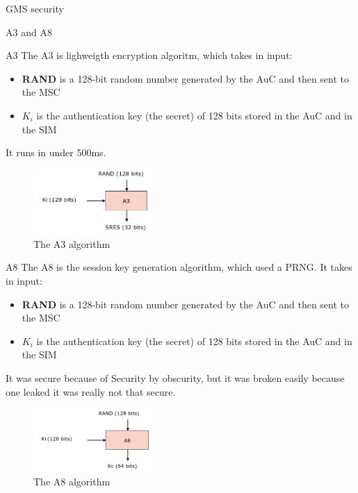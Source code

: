 \begin{section}{GMS security}
   \begin{subsection}{A3 and A8}
     \begin{subsubsection}{A3}
       The A3 is lighweigth encryption algoritm, which takes in input:
       \begin{itemize}
         \item \textbf{RAND} is a 128-bit random number generated by the AuC and then sent to the MSC
         \item \textbf{$K_i$} is the authentication key (the secret) of 128 bits stored in the AuC and
           in the SIM
       \end{itemize}
       It runs in under 500ms.
       \begin{figure}[h]
         \centering
         \includegraphics[width=0.4\textwidth]{img/wireless/a3.png}
         \caption{The A3 algorithm}
       \end{figure}
     \end{subsubsection}
     \begin{subsubsection}{A8}
       The A8 is the session key generation algorithm, which used a PRNG. It takes in input:
       \begin{itemize}
         \item \textbf{RAND} is a 128-bit random number generated by the AuC and then sent to the MSC
         \item \textbf{$K_i$} is the authentication key (the secret) of 128 bits stored in the AuC and
           in the SIM
       \end{itemize}
       It was secure because of Security by obscurity, but it was broken easily because one leaked
       it was really not that secure. 
       \begin{figure}[h]
         \centering
         \includegraphics[width=0.4\textwidth]{img/wireless/a8.png}
         \caption{The A8 algorithm}
       \end{figure}

\end{subsubsection}
\end{subsection}
\end{section}
